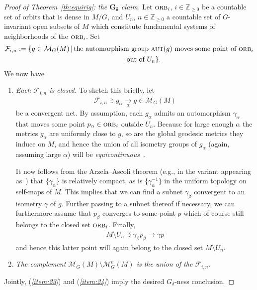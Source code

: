 \documentclass[10pt,a4paper]{amsart}
\numberwithin{equation}{section}
\newcommand{\cat}[1]{\textsc{#1}}
\begin{document}
\begin{proof}[Proof of Theorem~\ref{th:equirig}: the $\boldsymbol{G_{\delta}}$ claim]
 Let $\cat{orb}_i$, $i\in \mathbb{Z}_{\ge 0}$ be a countable set of orbits that is dense in $M/G$, and $U_n$, $n\in \mathbb{Z}_{\ge 0}$ a countable set of $G$-invariant open subsets of $M$ which constitute fundamental systems of neighborhoods of the $\cat{orb}_i$. Set
 \begin{gather*}
 \mathcal{F}_{i,n}:=\{g\in \mathcal{M}_G(M)\,|\, \text{the automorphism group }\cat{aut}(g)\text{ moves some point of }\cat{orb}_i
 \\ \hphantom{\mathcal{F}_{i,n}:=\{}
 \text{ out of }U_n\}.
 \end{gather*}
 We now have
 \begin{enumerate}[$(i)$]
 \item\label{item:23} {\it Each $\mathcal{F}_{i,n}$ is closed.} To sketch this briefly, let
 \begin{gather*}
 \mathcal{F}_{i,n}\ni g_{\alpha}\underset{\alpha}{\longrightarrow} g\in \mathcal{M}_G(M)
 \end{gather*}
 be a convergent net. By assumption, each $g_{\alpha}$ admits an automorphism $\gamma_{\alpha}$ that moves some point $p_{\alpha}\in \cat{orb}_i$ outside $U_n$. Because for large enough $\alpha$ the metrics $g_{\alpha}$ are uniformly close to $g$, so are the global geodesic metrics they induce on $M$, and hence the union of all isometry groups of $g_{\alpha}$ (again, assuming large $\alpha$) will be {\it equicontinuous}~\cite[Section~45, Definition]{mun}.

 It now follows from the Arzela--Ascoli theorem (e.g., in the variant appearing as~\cite[Theorem~47.1]{mun}) that $\{\gamma_{\alpha}\}$ is relatively compact, as is $\{\gamma_{\alpha}^{-1}\}$ in the uniform topology on self-maps of $M$. This implies that we can find a subnet $\gamma_{\beta}$ convergent to an isometry $\gamma$ of $g$. Further passing to a subnet thereof if necessary, we can furthermore assume that $p_{\beta}$ converges to some point $p$ which of course still belongs to the closed set $\cat{orb}_i$. Finally,
 \begin{gather*}
 M\setminus U_n\ni \gamma_{\beta} p_{\beta} \to \gamma p
 \end{gather*}
 and hence this latter point will again belong to the closed set $M\setminus U_n$.
 \item\label{item:24} {\it The complement $\mathcal{M}_G(M)\setminus \mathcal{M}^v_G(M)$ is the union of the $\mathcal{F}_{i,n}$.}
 \end{enumerate}
 Jointly, ({\it \ref{item:23}}) and ({\it \ref{item:24}}) imply the desired $G_{\delta}$-ness conclusion.
\end{proof}
\end{document}
